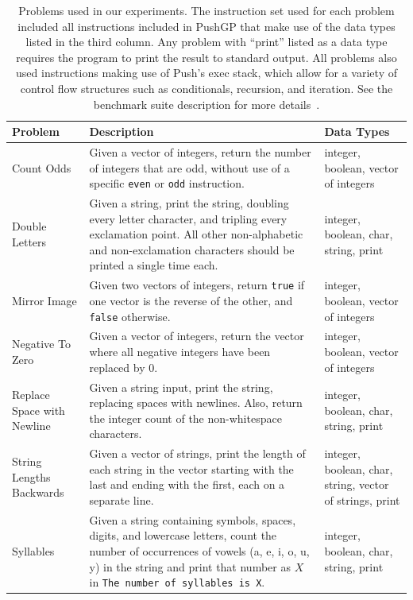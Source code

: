 \documentclass{sig-alternate}
\begin{document}
\begin{table}[t]
	\centering
	\caption{Problems used in our experiments. The instruction set used for each problem included all instructions included in PushGP that make use of the data types listed in the third column. Any problem with ``print'' listed as a data type requires the program to print the result to standard output. All problems also used instructions making use of Push's exec stack, which allow for a variety of control flow structures such as conditionals, recursion, and iteration. See the benchmark suite description for more details~\cite{Helmuth:2015:GECCO}.}
	\label{table:problems}
	\begin{tabu} to \textwidth {X[1.1,l] X[5,l] X[2.1,l]}
		\toprule
		\textbf{Problem} & \textbf{Description}  & \textbf{Data Types} \\
		\midrule
		Count Odds                 & Given a vector of integers, return the number of integers that are odd, without use of a specific \texttt{even} or \texttt{odd} instruction. & integer, boolean, vector of integers \\
		Double Letters             & Given a string, print the string, doubling every letter character, and tripling every exclamation point. All other non-alphabetic and non-exclamation characters should be printed a single time each. & integer, boolean, char, string, print \\
		Mirror Image               & Given two vectors of integers, return \texttt{true} if one vector is the reverse of the other, and \texttt{false} otherwise. & integer, boolean, vector of integers \\
		Negative To Zero           & Given a vector of integers, return the vector where all negative integers have been replaced by 0. & integer, boolean, vector of integers \\
		Replace Space with Newline & Given a string input, print the string, replacing spaces with newlines. Also, return the integer count of the non-whitespace characters. & integer, boolean, char, string, print \\
		String Lengths Backwards   & Given a vector of strings, print the length of each string in the vector starting with the last and ending with the first, each on a separate line. & integer, boolean, char, string, vector of strings, print \\
		Syllables                  & Given a string containing symbols, spaces, digits, and lowercase letters, count the number of occurrences of vowels (a, e, i, o, u, y) in the string and print that number as $X$ in \texttt{The number of syllables is X}. & integer, boolean, char, string, print \\

\end{tabu}
\end{table}
\end{document}
